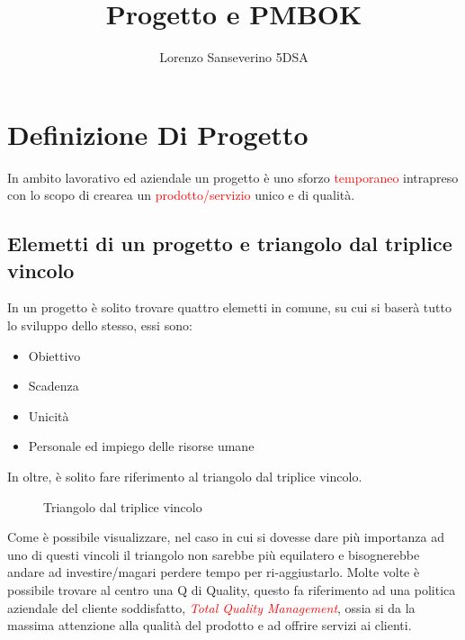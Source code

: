 \documentclass{article}
\title{Progetto e PMBOK}
\author{Lorenzo Sanseverino 5DSA}
\begin{document}
\maketitle



\tableofcontents
\section{Definizione Di Progetto}

In ambito lavorativo ed aziendale un progetto è uno sforzo \textcolor{red}{temporaneo} intrapreso con lo scopo di crearea un \textcolor{red}{prodotto/servizio} unico e di qualità. 

\subsection{Elemetti di un progetto e triangolo dal triplice vincolo}
In un progetto è solito trovare quattro elemetti in comune, su cui si baserà tutto lo sviluppo dello stesso, essi sono:

\begin{itemize}
\item Obiettivo
\item Scadenza
\item Unicità
\item Personale ed impiego delle risorse umane
\end{itemize}

In oltre, è solito fare riferimento al triangolo dal triplice vincolo.
\begin{figure}[h]
\caption{Triangolo dal triplice vincolo}
\label{t}
\end{figure}
Come è possibile visualizzare, nel caso in cui si dovesse dare più importanza ad uno di questi vincoli il triangolo non sarebbe più equilatero e bisognerebbe andare ad investire/magari perdere tempo per ri-aggiustarlo.
Molte volte è possibile trovare al centro una Q di Quality, questo fa riferimento ad una politica aziendale del cliente soddisfatto, \textit{\textcolor{red}{Total Quality Management}}, ossia si da la massima attenzione alla qualità del prodotto e ad offrire servizi ai clienti.
\end{document}
